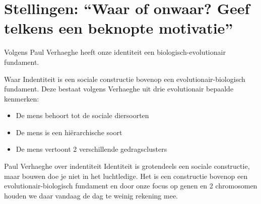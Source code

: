 \documentclass[main.tex]{subfiles}
\begin{document}
\section{Stellingen: ``Waar of onwaar? Geef telkens een beknopte motivatie''}

\begin{examenvraag}
    \begin{stelling}
        Volgens Paul Verhaeghe heeft onze identiteit een biologisch-evolutionair fundament.
    \end{stelling}

    \begin{stelling-antwoord}{Waar}
        Indentiteit is een sociale constructie bovenop een evolutionair-biologisch fundament. Deze bestaat volgens Verhaeghe uit drie evolutionair bepaalde kenmerken:
        \begin{itemize}
        \item De mens behoort tot de sociale diersoorten
        \item De mens is een hiërarchische soort
        \item De mens vertoont 2 verschillende gedragsclusters
        \end{itemize}
        \begin{citaat}{Paul Verhaeghe over indentiteit}
            Identiteit is grotendeels een sociale constructie, maar bouwen doe je niet in het luchtledige.
            Het is een constructie bovenop een evolutionair-biologisch fundament en door onze focus op genen en 2 chromosomen houden we daar vandaag de dag te weinig rekening mee.
        \end{citaat}
    \end{stelling-antwoord}
\end{examenvraag}
\end{document}
